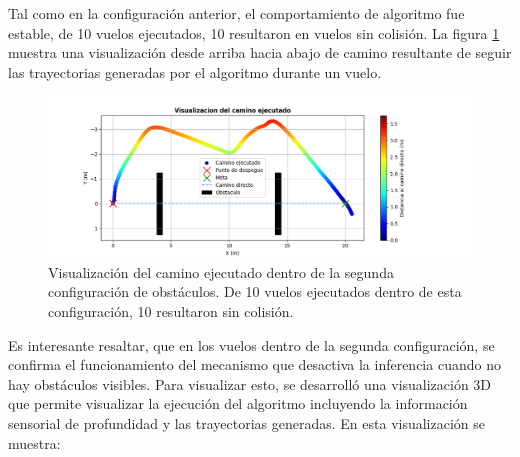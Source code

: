 Tal como en la configuración anterior, el comportamiento de algoritmo fue estable, de 10 vuelos ejecutados, 10 resultaron en vuelos sin colisión. La figura \ref{fig:double-graph} muestra una visualización desde arriba hacia abajo de camino resultante de seguir las trayectorias generadas por el algoritmo durante un vuelo. 

\begin{figure}[H]
    \centering
    \includegraphics[scale=0.55]{partes/ImgJoao/sim-double-panel-graph.png}
    \caption[Visualización del camino ejecutado dentro de la segunda configuración de obstáculos.]{Visualización del camino ejecutado dentro de la segunda configuración de obstáculos. De 10 vuelos ejecutados dentro de esta configuración, 10 resultaron sin colisión.}
    \label{fig:double-graph}
\end{figure}

Es interesante resaltar, que en los vuelos dentro de la segunda configuración, se confirma el funcionamiento del mecanismo que desactiva la inferencia cuando no hay obstáculos visibles. Para visualizar esto, se desarrolló una visualización 3D que permite visualizar la ejecución del algoritmo incluyendo la información sensorial de profundidad y las trayectorias generadas. En esta visualización se muestra:

